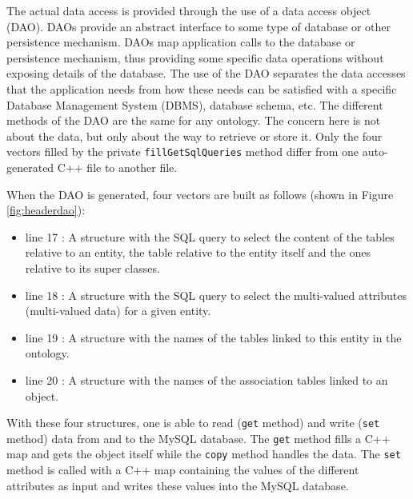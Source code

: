 The actual data access is provided through the use of a data access object (DAO).
DAOs provide an abstract interface to some type of database or other persistence
mechanism. DAOs map application calls to the database or persistence mechanism, 
thus providing some specific data operations without exposing
details of the database. The use of the DAO separates the data accesses that the application needs from how these needs can be satisfied with a specific
Database Management System (DBMS), database schema, etc. 
The different methods of the DAO are the same for any ontology. 
The concern here is not about the data, but only about the way to retrieve or store it. Only the four vectors filled by the
private \texttt{fillGetSqlQueries} method differ from one 
auto-generated C++ file to another file.

When the DAO is generated, four vectors are built as follows (shown in Figure \ref{fig:headerdao}):

\begin{itemize}
\item line \textcolor{BrickRed}{17} : A structure with the SQL query to select the content of the tables relative to an entity, the table relative to the entity itself and the ones relative to its super classes.
\item line \textcolor{BrickRed}{18} : A structure with the SQL query to select the multi-valued attributes (multi-valued data) for a given entity.
\item line \textcolor{BrickRed}{19} : A structure with the names of the tables linked to this entity in the ontology.
\item line \textcolor{BrickRed}{20} : A structure with the names of the association tables linked to an object.
\end{itemize}

With these four structures, one is able to read (\texttt{get} method) and write (\texttt{set} method) data from and to the MySQL database. The \texttt{get} method fills 
a C++ map and gets the object itself while the \texttt{copy} method handles the data. The \texttt{set} method is called with a C++ map containing the values of the 
different attributes as input and writes these values into the MySQL database.


